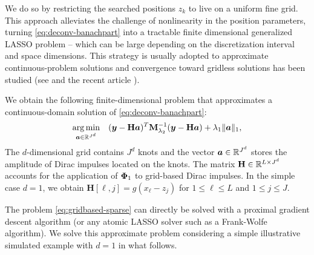 
    
        We do so by restricting the searched positions $z_k$ to live on a uniform fine grid. This approach alleviates the challenge of nonlinearity in the position parameters, turning \eqref{eq:deconv-banachpart} into a tractable finite dimensional generalized LASSO problem -- which can be large depending on the discretization interval and space dimensions. This strategy is usually adopted to approximate continuous-problem solutions \cite{simeoni2020functional,Debarre2019} and convergence toward gridless solutions has been studied (see \cite{duval2017sparseI,debarre2022part2} and the recent article \cite{guillemet2025a}). 

        We obtain the following finite-dimensional problem\footnotemark{} that approximates a continuous-domain solution of \eqref{eq:deconv-banachpart}:
        \begin{equation}
            \label{eq:gridbased-sparse}
            \underset{ \bm{a} \in \mathbb{R}^{J^d}}{\arg\min} \quad ( \bm{y} - \mathbf{H}\bm{a}  )^T \mathbf{M}_{\lambda_{2}}^{-1} ( \bm{y} - \mathbf{H}\bm{a}  )  + \lambda_{1} \| \bm{a} \|_{1},
        \end{equation}
        The $d$-dimensional grid contains $J^d$ knots and the vector $\bm{a}\in\mathbb{R}^{J^d}$ stores the amplitude of Dirac impulses located on the knots.
        The matrix $\mathbf{H} \in \mathbb{R}^{L \times J^d}$ accounts for the application of ${\bm{\Phi}_1}$ to grid-based Dirac impulses.
        In the simple case $d=1$, we obtain $\mathbf{H}[\ell, j] = g(x_{\ell} - z_j)$ for $1 \leq \ell \leq L $ and $1 \leq j \leq J$.
        
        The problem \eqref{eq:gridbased-sparse} can directly be solved with a proximal gradient descent algorithm (or any atomic LASSO solver such as a Frank-Wolfe algorithm). We solve this approximate problem considering a simple illustrative simulated example with $d=1$ in what follows.

